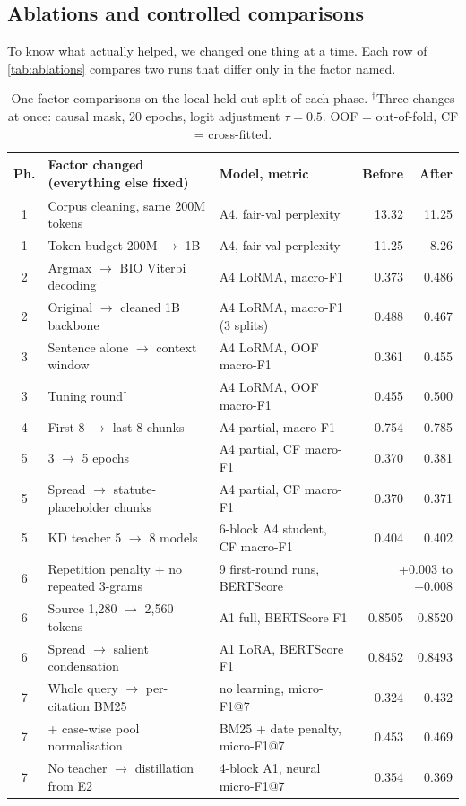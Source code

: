 \documentclass[11pt, oneside]{article}
\begin{document}
\subsection{Ablations and controlled comparisons}
To know what actually helped, we changed one thing at a time.  Each row of \autoref{tab:ablations} compares
two runs that differ only in the factor named.

\begin{table}[!t]\centering\footnotesize
\caption{One-factor comparisons on the local held-out split of each phase.  $^\dagger$Three changes at once:
causal mask, 20 epochs, logit adjustment $\tau=0.5$.  OOF = out-of-fold, CF = cross-fitted.}\label{tab:ablations}
\scriptsize\begin{tabularx}{\linewidth}{cXlrr}\toprule
Ph. & Factor changed (everything else fixed) & Model, metric & Before & After\\\midrule
1 & Corpus cleaning, same 200M tokens & A4, fair-val perplexity & 13.32 & 11.25\\
1 & Token budget 200M $\rightarrow$ 1B & A4, fair-val perplexity & 11.25 & 8.26\\
2 & Argmax $\rightarrow$ BIO Viterbi decoding & A4 LoRMA, macro-F1 & 0.373 & 0.486\\
2 & Original $\rightarrow$ cleaned 1B backbone & A4 LoRMA, macro-F1 (3 splits) & 0.488 & 0.467\\
3 & Sentence alone $\rightarrow$ context window & A4 LoRMA, OOF macro-F1 & 0.361 & 0.455\\
3 & Tuning round$^\dagger$ & A4 LoRMA, OOF macro-F1 & 0.455 & 0.500\\
4 & First 8 $\rightarrow$ last 8 chunks & A4 partial, macro-F1 & 0.754 & 0.785\\
5 & 3 $\rightarrow$ 5 epochs & A4 partial, CF macro-F1 & 0.370 & 0.381\\
5 & Spread $\rightarrow$ statute-placeholder chunks & A4 partial, CF macro-F1 & 0.370 & 0.371\\
5 & KD teacher 5 $\rightarrow$ 8 models & 6-block A4 student, CF macro-F1 & 0.404 & 0.402\\
6 & Repetition penalty + no repeated 3-grams & 9 first-round runs, BERTScore & \multicolumn{2}{r}{+0.003 to +0.008}\\
6 & Source 1,280 $\rightarrow$ 2,560 tokens & A1 full, BERTScore F1 & 0.8505 & 0.8520\\
6 & Spread $\rightarrow$ salient condensation & A1 LoRA, BERTScore F1 & 0.8452 & 0.8493\\
7 & Whole query $\rightarrow$ per-citation BM25 & no learning, micro-F1@7 & 0.324 & 0.432\\
7 & + case-wise pool normalisation & BM25 + date penalty, micro-F1@7 & 0.453 & 0.469\\
7 & No teacher $\rightarrow$ distillation from E2 & 4-block A1, neural micro-F1@7 & 0.354 & 0.369\\
\bottomrule\end{tabularx}\end{table}
\end{document}
